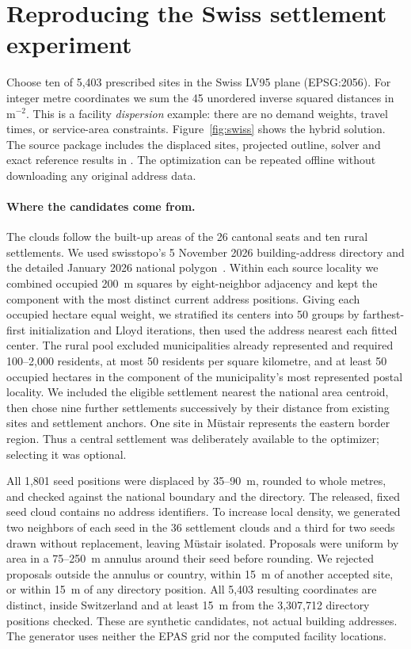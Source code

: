 \documentclass[a4paper,12pt]{article}
\numberwithin{equation}{section}
\begin{document}
\section{Reproducing the Swiss settlement experiment}\label{sec:swiss-density}
Choose ten of 5,403 prescribed sites in the Swiss LV95 plane (EPSG:2056).
For integer metre coordinates we sum the 45 unordered inverse squared distances in
$\mathrm{m}^{-2}$. This is a facility \emph{dispersion} example: there are no demand weights,
travel times, or service-area constraints. Figure~\ref{fig:swiss} shows the hybrid
solution. The source package includes the displaced sites, projected outline, solver and
exact reference results in . The optimization can be repeated
offline without downloading any original address data.

\paragraph{Where the candidates come from.}
The clouds follow the built-up areas of the 26 cantonal seats and ten rural settlements.
We used swisstopo's 5 November 2026 building-address directory and the detailed
January 2026 national polygon~\cite{swissaddresses,swissboundary}.
Within each source locality we combined occupied 200~m squares by eight-neighbor
adjacency and kept the component with the most distinct current address positions.
Giving each occupied hectare equal weight, we stratified its centers into 50 groups
by farthest-first initialization and Lloyd iterations, then used the address nearest
each fitted center. The rural pool excluded municipalities already represented and
required 100--2,000 residents, at most 50 residents per square kilometre, and at least
50 occupied hectares in the component of the municipality's most represented postal
locality. We included the eligible settlement nearest the national area centroid, then
chose nine further settlements successively by their distance from existing sites and
settlement anchors. One site in Müstair represents the eastern border region.
Thus a central settlement was deliberately available to the optimizer; selecting it
was optional.

All 1,801 seed positions were displaced by 35--90~m, rounded to whole metres,
and checked against the national boundary and the directory. The released, fixed seed
cloud contains no address identifiers. To increase local density, we generated two
neighbors of each seed in the 36 settlement clouds and a third for two seeds drawn
without replacement, leaving Müstair isolated. Proposals were uniform by area in a
75--250~m annulus around their seed before rounding. We rejected proposals outside
the annulus or country, within 15~m of another accepted site, or within 15~m of any
directory position. All 5,403 resulting coordinates are distinct, inside Switzerland
and at least 15~m from the 3,307,712 directory positions checked. These are
synthetic candidates, not actual building addresses. The generator uses neither
the EPAS grid nor the computed facility locations.
\end{document}
